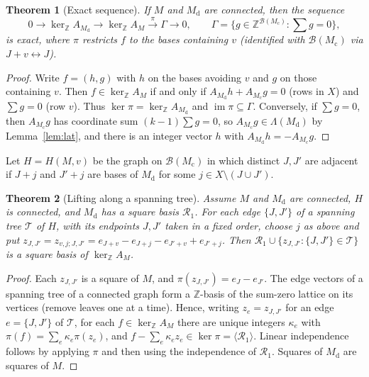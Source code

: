 \documentclass[11pt,a4paper]{article}
\theoremstyle{plain}
\newtheorem{theorem}{Theorem}[section]
\theoremstyle{definition}
\newcommand{\Z}{\mathbb Z}
\newcommand{\kerZ}{\ker_{\Z}\!A_M}
\newcommand{\bs}{\mathcal B}
\begin{document}
\begin{theorem}[Exact sequence]\label{thm:exact}
If $M$ and $M_{\mathrm d}$ are connected, then the sequence
\[
0\to\ker_\Z A_{M_{\mathrm d}}\to\kerZ\xrightarrow{\ \pi\ }\Gamma\to0,\qquad \Gamma=\Big\{g\in\Z^{\bs(M_{\mathrm c})}:\textstyle\sum g=0\Big\},
\]
is exact, where $\pi$ restricts $f$ to the bases containing $v$ (identified with $\bs(M_{\mathrm c})$ via $J+v\leftrightarrow J$).
\end{theorem}
\begin{proof}
Write $f=(h,g)$ with $h$ on the bases avoiding $v$ and $g$ on those containing $v$. Then $f\in\kerZ$ if and only if $A_{M_{\mathrm d}}h+A_{M_{\mathrm c}}g=0$ (rows in $X$) and $\sum g=0$ (row $v$). Thus $\ker\pi=\ker_\Z A_{M_{\mathrm d}}$ and $\operatorname{im}\pi\subseteq\Gamma$. Conversely, if $\sum g=0$, then $A_{M_{\mathrm c}}g$ has coordinate sum $(k-1)\sum g=0$, so $A_{M_{\mathrm c}}g\in\Lambda(M_{\mathrm d})$ by Lemma~\ref{lem:lat}, and there is an integer vector $h$ with $A_{M_{\mathrm d}}h=-A_{M_{\mathrm c}}g$.
\end{proof}

Let $H=H(M,v)$ be the graph on $\bs(M_{\mathrm c})$ in which distinct $J,J'$ are adjacent if $J+j$ and $J'+j$ are bases of $M_{\mathrm d}$ for some $j\in X\setminus(J\cup J')$.

\begin{theorem}[Lifting along a spanning tree]\label{thm:tree}
Assume $M$ and $M_{\mathrm d}$ are connected, $H$ is connected, and $M_{\mathrm d}$ has a square basis $\mathcal R_1$. For each edge $\{J,J'\}$ of a spanning tree $\mathcal T$ of $H$, with its endpoints $J,J'$ taken in a fixed order, choose $j$ as above and put $z_{J,J'}=z_{v,j;J,J'}=e_{J+v}-e_{J+j}-e_{J'+v}+e_{J'+j}$. Then $\mathcal R_1\cup\{z_{J,J'}:\{J,J'\}\in\mathcal T\}$ is a square basis of $\kerZ$.
\end{theorem}
\begin{proof}
Each $z_{J,J'}$ is a square of $M$, and $\pi(z_{J,J'})=e_J-e_{J'}$. The edge vectors of a spanning tree of a connected graph form a $\Z$-basis of the sum-zero lattice on its vertices (remove leaves one at a time). Hence, writing $z_e=z_{J,J'}$ for an edge $e=\{J,J'\}$ of $\mathcal T$, for each $f\in\kerZ$ there are unique integers $\kappa_e$ with $\pi(f)=\sum_e\kappa_e\pi(z_e)$, and $f-\sum_e\kappa_ez_e\in\ker\pi=\langle\mathcal R_1\rangle$. Linear independence follows by applying $\pi$ and then using the independence of $\mathcal R_1$. Squares of $M_{\mathrm d}$ are squares of $M$.
\end{proof}
\end{document}
